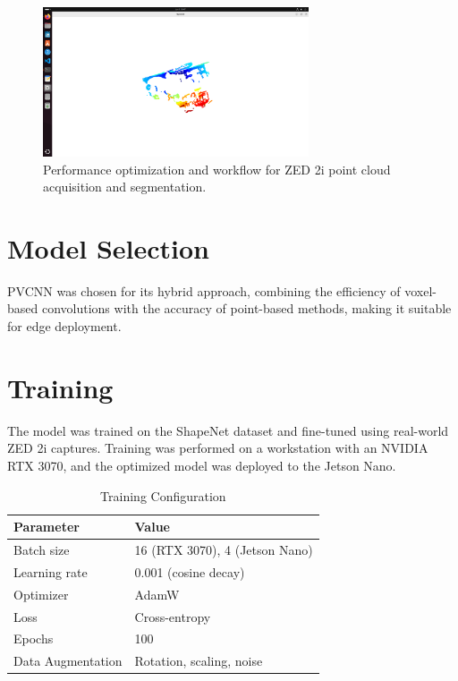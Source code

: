 \documentclass[12pt,a4paper]{report}
\begin{document}
\begin{figure}[htbp]
    \centering
    \includegraphics[width=0.7\textwidth]{figures/performance_optimisation.png}
    \caption{Performance optimization and workflow for ZED 2i point cloud acquisition and segmentation.}
    \label{fig:dev_setup}
\end{figure}

\section{Model Selection}
PVCNN was chosen for its hybrid approach, combining the efficiency of voxel-based convolutions with the accuracy of point-based methods, making it suitable for edge deployment.

\section{Training}
The model was trained on the ShapeNet dataset and fine-tuned using real-world ZED 2i captures. Training was performed on a workstation with an NVIDIA RTX 3070, and the optimized model was deployed to the Jetson Nano.

\begin{table}[htbp]
    \centering
    \caption{Training Configuration}
    \label{tab:train_config}
    \begin{tabular}{ll}
        \toprule
        Parameter & Value \\
        \midrule
        Batch size & 16 (RTX 3070), 4 (Jetson Nano) \\
        Learning rate & 0.001 (cosine decay) \\
        Optimizer & AdamW \\
        Loss & Cross-entropy \\
        Epochs & 100 \\
        Data Augmentation & Rotation, scaling, noise \\
        \bottomrule
    \end{tabular}
\end{table}
\end{document}
